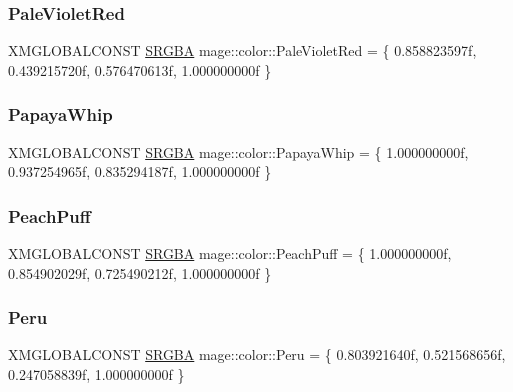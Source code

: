 \hypertarget{namespacemage_1_1color_a97a3a91746e2efcb1eb2a7f335eed330}{}\label{namespacemage_1_1color_a97a3a91746e2efcb1eb2a7f335eed330} 
\subsubsection{\texorpdfstring{Pale\+Violet\+Red}{PaleVioletRed}}
{\footnotesize\ttfamily X\+M\+G\+L\+O\+B\+A\+L\+C\+O\+N\+ST \hyperlink{structmage_1_1_s_r_g_b_a}{S\+R\+G\+BA} mage\+::color\+::\+Pale\+Violet\+Red = \{ 0.\+858823597f, 0.\+439215720f, 0.\+576470613f, 1.\+000000000f \}}

\hypertarget{namespacemage_1_1color_ae5a2ee6874c7974e6299b964f50c8d69}{}\label{namespacemage_1_1color_ae5a2ee6874c7974e6299b964f50c8d69} 
\subsubsection{\texorpdfstring{Papaya\+Whip}{PapayaWhip}}
{\footnotesize\ttfamily X\+M\+G\+L\+O\+B\+A\+L\+C\+O\+N\+ST \hyperlink{structmage_1_1_s_r_g_b_a}{S\+R\+G\+BA} mage\+::color\+::\+Papaya\+Whip = \{ 1.\+000000000f, 0.\+937254965f, 0.\+835294187f, 1.\+000000000f \}}

\hypertarget{namespacemage_1_1color_a2c787fca871e90644915ac6b141aa367}{}\label{namespacemage_1_1color_a2c787fca871e90644915ac6b141aa367} 
\subsubsection{\texorpdfstring{Peach\+Puff}{PeachPuff}}
{\footnotesize\ttfamily X\+M\+G\+L\+O\+B\+A\+L\+C\+O\+N\+ST \hyperlink{structmage_1_1_s_r_g_b_a}{S\+R\+G\+BA} mage\+::color\+::\+Peach\+Puff = \{ 1.\+000000000f, 0.\+854902029f, 0.\+725490212f, 1.\+000000000f \}}

\hypertarget{namespacemage_1_1color_a31189488f43ecef8ed0e26625be2c73d}{}\label{namespacemage_1_1color_a31189488f43ecef8ed0e26625be2c73d} 
\subsubsection{\texorpdfstring{Peru}{Peru}}
{\footnotesize\ttfamily X\+M\+G\+L\+O\+B\+A\+L\+C\+O\+N\+ST \hyperlink{structmage_1_1_s_r_g_b_a}{S\+R\+G\+BA} mage\+::color\+::\+Peru = \{ 0.\+803921640f, 0.\+521568656f, 0.\+247058839f, 1.\+000000000f \}}

